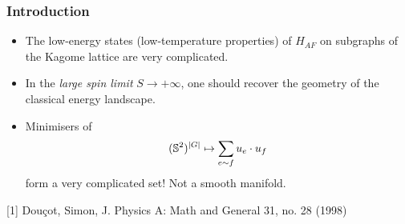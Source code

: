 \documentclass[mathserif]{beamer}
\begin{document}
\begin{frame}
\begin{center}
\begin{picture}
        \end{picture}
      \end{center}

    \end{frame}

    \begin{frame}
      \frametitle{Introduction}
      \begin{itemize}
      \item The low-energy states (low-temperature properties) of
        $H_{AF}$ on subgraphs of the Kagome lattice are very
        complicated.
      \item<2-> In the \emph{large spin limit} $S\to +\infty$, one
        should recover the geometry of the classical energy landscape.
      \item<2-> Minimisers of
        \[
          (\S^2)^{|G|} \mapsto \sum_{e\sim f}u_e\cdot u_f
        \]
        form a very complicated set! Not a smooth manifold.
      \end{itemize}

      \footnotesize{[1] Douçot, Simon, J. Physics A: Math and General 31, no. 28 (1998)}
    \end{frame}
\end{document}
